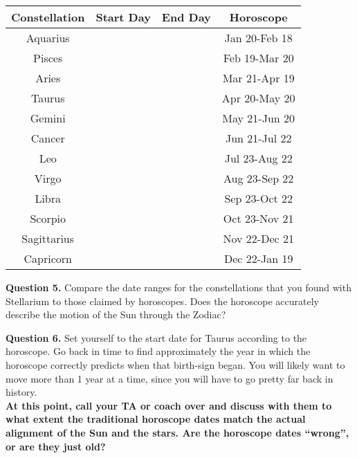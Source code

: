 \documentclass[11pt]{article}
\begin{document}
\begin{center}
	\begin{tabular}{|c|c|c|c|}
		\hline
		Constellation&Start Day&End Day&Horoscope\\ \hline
		Aquarius    & & &Jan 20-Feb 18\\ \hline
		Pisces      & & &Feb 19-Mar 20\\ \hline
		Aries       & & &Mar 21-Apr 19\\ \hline
		Taurus      & & &Apr 20-May 20\\ \hline
		Gemini      & & &May 21-Jun 20\\ \hline
		Cancer      & & &Jun 21-Jul 22\\ \hline
		Leo         & & &Jul 23-Aug 22\\ \hline	
		Virgo       & & &Aug 23-Sep 22\\ \hline
		Libra       & & &Sep 23-Oct 22\\ \hline
		Scorpio     & & &Oct 23-Nov 21\\ \hline
		Sagittarius & & &Nov 22-Dec 21\\ \hline
		Capricorn   & & &Dec 22-Jan 19\\
		\hline
	\end{tabular}
\end{center}

\textbf{Question 5.} Compare the date ranges for the constellations that you found with Stellarium to those claimed by horoscopes. Does the horoscope accurately describe the motion of the Sun through the Zodiac?\\

\vspace{1.5cm}

\textbf{Question 6.} Set yourself to the start date for Taurus according to the horoscope. Go back in time to find approximately the year in which the horoscope correctly predicts when that birth-sign began. You will likely want to move more than 1 year at a time, since you will have to go pretty far back in history.\\



\bf At this point, call your TA or coach over and discuss with them to what extent the traditional horoscope dates match the actual alignment of the Sun and the stars. Are the horoscope dates ``wrong'', or are they just old?
\rm
\end{document}

